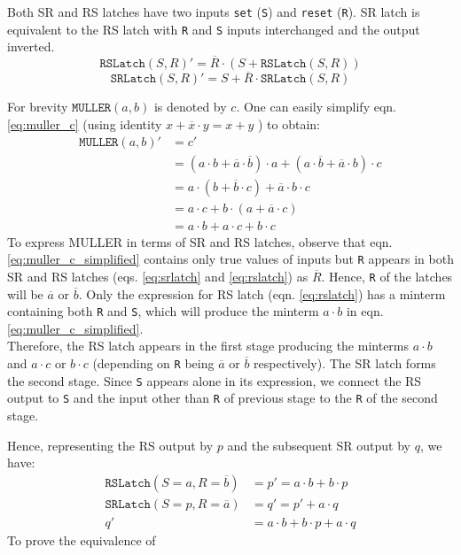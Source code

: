 Both SR and RS latches have two inputs \texttt{set} (\texttt{S}) and
\texttt{reset} (\texttt{R}). 
SR latch is equivalent to the RS latch with \texttt{R} and \texttt{S} inputs
interchanged and the output inverted.
\begin{equation}\label{eq:rslatch}
	\texttt{RSLatch}(S,R)' = \overline{R} \cdot (S + \texttt{RSLatch}(S,R))
\end{equation}
\begin{equation}\label{eq:srlatch}
	\texttt{SRLatch}(S,R)' = S + \overline{R} \cdot \texttt{SRLatch}(S,R)
\end{equation}

For brevity $\texttt{MULLER}(a,b)$ is denoted by $c$. 
 One can easily simplify eqn. \ref{eq:muller_c} (using identity $x + \overline{x}
 \cdot y = x + y$ ) to obtain:
\begin{equation}\label{eq:muller_c_simplified}
\begin{split}
	\texttt{MULLER}(a,b)' &= c'\\
	&= (a \cdot b + \overline{a} \cdot \overline{b}) \cdot a 
		+ (a \cdot \overline{b} + \overline{a} \cdot b) \cdot c \\
	&= a \cdot (b + \overline{b} \cdot c) + \overline{a} \cdot b \cdot c \\
	&= a \cdot c + b \cdot (a + \overline{a} \cdot c) \\
	&= a \cdot b + a \cdot c + b \cdot c
\end{split}
\end{equation}
To express MULLER in terms of SR and RS latches, 
observe that eqn. \ref{eq:muller_c_simplified} contains only true values of
inputs but \texttt{R} appears in both SR and RS latches (eqs. \ref{eq:srlatch}
and \ref{eq:rslatch}) as $\overline{R}$. 
Hence, \texttt{R} of the latches will be $\overline{a}$ or $\overline{b}$.
Only the expression for RS latch (eqn. \ref{eq:rslatch}) has a minterm containing both \texttt{R}
and \texttt{S}, which will produce the minterm $ a \cdot b $ in eqn. \ref{eq:muller_c_simplified}.
\\
Therefore, the RS latch appears in the first stage producing the minterms $a
\cdot b$ and $a \cdot c$ or $b \cdot c$ (depending on \texttt{R} being
$\overline{a}$ or $\overline{b}$ respectively). 
The SR latch forms the second stage.
Since \texttt{S} appears alone in its expression, we connect the RS output
to \texttt{S} and the input other than \texttt{R} of previous stage to the
\texttt{R} of the second stage.

Hence, representing the RS output by $p$ and the subsequent SR output by $q$,
we have:
\begin{equation}\label{eq:muller_rs}
\begin{split}
	\texttt{RSLatch}(S=a, R=\overline{b}) &= p' = a \cdot b + b \cdot p \\
	\texttt{SRLatch}(S=p, R=\overline{a}) &= q' = p' + a \cdot q \\
	q' &= a \cdot b + b \cdot p + a \cdot q
\end{split}
\end{equation}
To prove the equivalence of 
